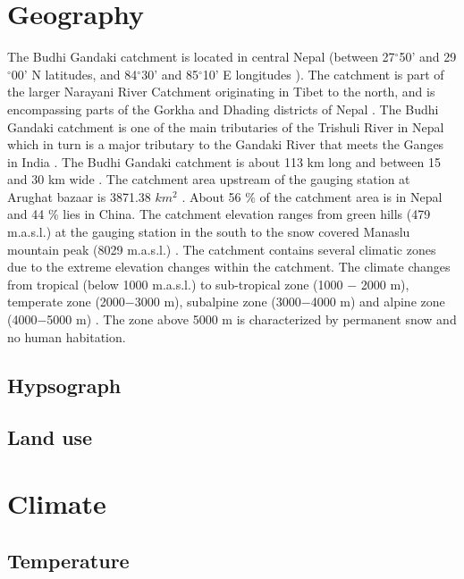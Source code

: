 \section{Geography}


The Budhi Gandaki catchment is located in central Nepal (between 27$^{\circ}$50' and 29$^{\circ}$00' N latitudes, and 84$^{\circ}$30' and 85$^{\circ}$10' E longitudes \parencite{marahatta2021hydrological}). The catchment is part of the larger Narayani River Catchment originating in Tibet to the north, and is encompassing parts of the Gorkha and Dhading districts of Nepal \parencite{devkota_climate_2017}. The Budhi Gandaki catchment is one of the main tributaries of the Trishuli River in Nepal which in turn is a major tributary to the Gandaki River that meets the Ganges in India \parencite{khatri_modelling_2018}. The Budhi Gandaki catchment is about 113 km long and between 15 and 30 km wide \parencite{marahatta2021hydrological}. The catchment area upstream of the gauging station at Arughat bazaar is 3871.38 $km^{2}$ \parencite{khatri2018modelling}. About 56 $\%$ of the catchment area is in Nepal and 44 $\%$ lies in China. The catchment elevation ranges from green hills (479 m.a.s.l.) at the gauging station in the south to the snow covered Manaslu mountain peak (8029 m.a.s.l.) \parencite{khatri_modelling_2018}. The catchment contains several climatic zones due to the extreme elevation changes within the catchment. The climate changes from tropical (below 1000 m.a.s.l.) to sub-tropical zone (1000 $-$ 2000 m), temperate zone (2000$-$3000 m), subalpine zone (3000$-$4000 m) and alpine zone (4000$-$5000 m) \parencite{khatri2018modelling}. The zone above 5000 m is characterized by permanent snow and no human habitation.

\subsection{Hypsograph}

\subsection{Land use}

\section{Climate}

\subsection{Temperature}

